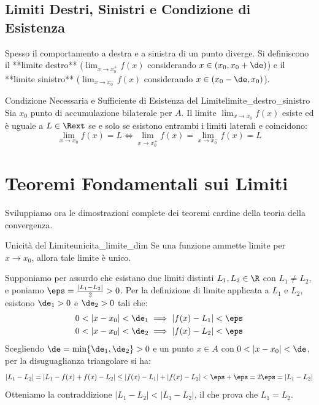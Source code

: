 \subsection{Limiti Destri, Sinistri e Condizione di Esistenza}
Spesso il comportamento a destra e a sinistra di un punto diverge. Si definiscono il **limite destro** ($\lim_{x \to x_0^+} f(x)$ considerando $x \in (x_0, x_0+\de)$) e il **limite sinistro** ($\lim_{x \to x_0^-} f(x)$ considerando $x \in (x_0-\de, x_0)$).

\begin{teorema}{Condizione Necessaria e Sufficiente di Esistenza del Limite}{limite_destro_sinistro}
Sia $x_0$ punto di accumulazione bilaterale per $A$. Il limite $\lim_{x \to x_0} f(x)$ esiste ed è uguale a $L \in \Rext$ se e solo se esistono entrambi i limiti laterali e coincidono:
\[
    \lim_{x \to x_0} f(x) = L \iff \lim_{x \to x_0^+} f(x) = \lim_{x \to x_0^-} f(x) = L
\]
\end{teorema}

\section{Teoremi Fondamentali sui Limiti}
\label{sec:teoremi_limiti_dimostrazioni}

Sviluppiamo ora le dimostrazioni complete dei teoremi cardine della teoria della convergenza.

\begin{teorema}{Unicità del Limite}{unicita_limite_dim}
Se una funzione ammette limite per $x \to x_0$, allora tale limite è unico.
\end{teorema}

\begin{dimostrazione}
Supponiamo per assurdo che esistano due limiti distinti $L_1, L_2 \in \R$ con $L_1 \neq L_2$, e poniamo $\eps = \frac{|L_1 - L_2|}{2} > 0$.
Per la definizione di limite applicata a $L_1$ e $L_2$, esistono $\de_1 > 0$ e $\de_2 > 0$ tali che:
\begin{align*}
    0 < |x - x_0| < \de_1 &\implies |f(x) - L_1| < \eps \\
    0 < |x - x_0| < \de_2 &\implies |f(x) - L_2| < \eps
\end{align*}
Scegliendo $\de = \min\{\de_1, \de_2\} > 0$ e un punto $x \in A$ con $0 < |x - x_0| < \de$, per la disuguaglianza triangolare si ha:
\[
    |L_1 - L_2| = |L_1 - f(x) + f(x) - L_2| \le |f(x) - L_1| + |f(x) - L_2| < \eps + \eps = 2\eps = |L_1 - L_2|
\]
Otteniamo la contraddizione $|L_1 - L_2| < |L_1 - L_2|$, il che prova che $L_1 = L_2$.
\end{dimostrazione}

